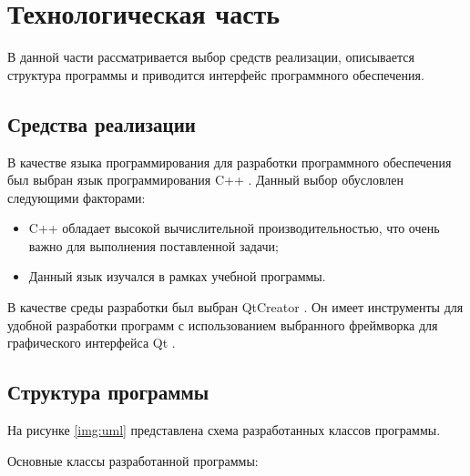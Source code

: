 \section{Технологическая часть}

В данной части рассматривается выбор средств реализации, описывается структура программы и приводится интерфейс программного обеспечения.

\subsection{Средства реализации}

В качестве языка программирования для разработки программного обеспечения был выбран язык программирования C++ \cite{cpp}. Данный выбор обусловлен следующими факторами:

\begin{itemize}
	\item C++ обладает высокой вычислительной производительностью, что очень важно для выполнения поставленной задачи;
	\item Данный язык изучался в рамках учебной программы.
\end{itemize}

В качестве среды разработки был выбран QtCreator \cite{qtcreator}. Он имеет инструменты для удобной разработки программ с использованием выбранного фреймворка для графического интерфейса Qt \cite{qt}.

\subsection{Структура программы}

На рисунке \ref{img:uml} представлена схема разработанных классов программы.


Основные классы разработанной программы:

